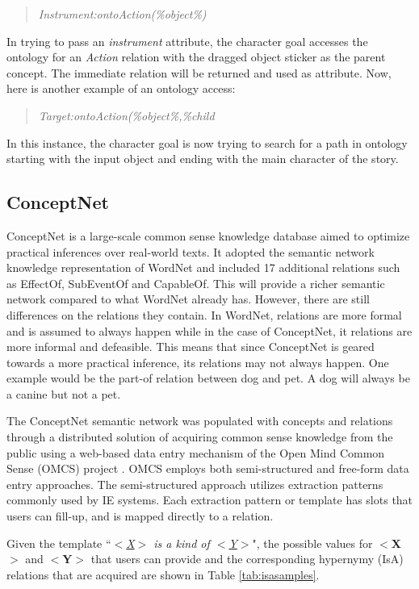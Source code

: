 \begin{verse}
\itshape
Instrument:ontoAction(\%object\%)
\end{verse}

In trying to pass an \textit{instrument} attribute, the character goal accesses the ontology for an \textit{Action} relation with the dragged object sticker as the parent concept. The immediate relation will be returned and used as attribute. Now, here is another example of an ontology access:

\begin{verse}
\itshape
Target:ontoAction(\%object\%,\%child%
\end{verse}

In this instance, the character goal is now trying to search for a path in ontology starting with the input object and ending with the main character of the story.

\subsection{ConceptNet}
\label{sec:conceptnet}

ConceptNet \cite{Liu:2004b} is a large-scale common sense knowledge database aimed to optimize practical inferences over real-world texts. It adopted the semantic network knowledge representation of WordNet and included 17 additional relations such as EffectOf, SubEventOf and CapableOf. This will provide a richer semantic network compared to what WordNet already has. However, there are still differences on the relations they contain. In WordNet, relations are more formal and is assumed to always happen while in the case of ConceptNet, it relations are more informal and defeasible. This means that since ConceptNet is geared towards a more practical inference, its relations may not always happen. One example would be the part-of relation between dog and pet. A dog will always be a canine but not a pet. 

The ConceptNet semantic network was populated with concepts and relations through a distributed solution of acquiring common sense knowledge from the public using a web-based data entry mechanism of the Open Mind Common Sense (OMCS) project \cite{Singh:2002}. OMCS employs both semi-structured and free-form data entry approaches. The semi-structured approach utilizes extraction patterns commonly used by IE systems. Each extraction pattern or template has slots that users can fill-up, and is mapped directly to a relation.

Given the template ``\textit{\underline{$<$X$>$} is a kind of \underline{$<$Y$>$}}", the possible values for \textbf{$<$X$>$} and \textbf{$<$Y$>$} that users can provide and the corresponding hypernymy (IsA) relations that are acquired are shown in Table \ref{tab:isasamples}.

